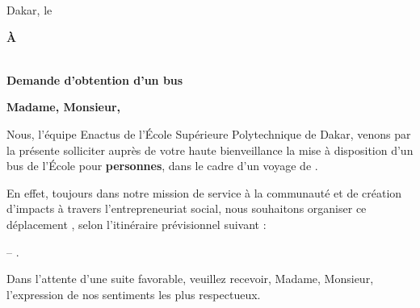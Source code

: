 \documentclass[11pt,a4paper]{article}
\begin{document}
\MakeLetterStart
\begin{flushright}Dakar, le \LetterDate\end{flushright}
\begin{flushright}\textbf{À \RecipientTitle}\\\RecipientOrganization\end{flushright}
\vspace{2mm}
 \DocReference\\
 \textbf{Demande d'obtention d'un bus}
\vspace{3mm}

\textbf{Madame, Monsieur,}

\justifying
Nous, l'équipe Enactus de l'École Supérieure Polytechnique de Dakar, venons par la présente solliciter auprès de votre haute bienveillance la mise à disposition d'un bus de l'École pour \textbf{\PassengerCount{} personnes}, dans le cadre d'un voyage de \textbf{\TripPurpose}.

En effet, toujours dans notre mission de service à la communauté et de création d'impacts à travers l'entrepreneuriat social, nous souhaitons organiser ce déplacement \textbf{\TravelPeriod}, selon l'itinéraire prévisionnel suivant :
\begin{itemize}\RouteItems\end{itemize}

 \AdditionalNeed\par
{} \GroupLeaderName{} -- \GroupLeaderPhone.

Dans l'attente d'une suite favorable, veuillez recevoir, Madame, Monsieur, l'expression de nos sentiments les plus respectueux.

\SingleSignature{\SignerRole}{\SignerName}{\SignerPhone}
\end{document}
